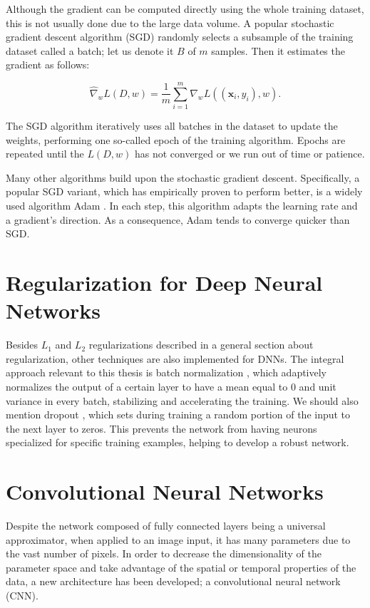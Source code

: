 Although the gradient can be computed directly using the whole training dataset, this is not usually done due to the large data volume. A popular stochastic gradient descent algorithm (SGD) \citep{kiefer1952stochastic} randomly selects a subsample of the training dataset called a batch; let us denote it $B$ of $m$ samples. Then it estimates the gradient as follows:

\begin{equation}
	\hat{\nabla}_w L(D, w) = \frac{1}{m} \sum_{i=1}^m \nabla_w L((\textbf{x}_i, y_i), w).
\end{equation}
 

The SGD algorithm iteratively uses all batches in the dataset to update the weights, performing one so-called epoch of the training algorithm. Epochs are repeated until the $L(D, w)$ has not converged or we run out of time or patience.

Many other algorithms build upon the stochastic gradient descent. Specifically, a popular SGD variant, which has empirically proven to perform better, is a widely used algorithm Adam \citep{kingma2014adam}. In each step, this algorithm adapts the learning rate and a gradient’s direction. As a consequence, Adam tends to converge quicker than SGD.

\section{Regularization for Deep Neural Networks}

Besides $L_1$ and $L_2$ regularizations described in a general section about regularization, other techniques are also implemented for DNNs. The integral approach relevant to this thesis is batch normalization \citep{ioffe2015batch}, which adaptively normalizes the output of a certain layer to have a mean equal to 0 and unit variance in every batch, stabilizing and accelerating the training. We should also mention dropout \citep{srivastava2014dropout}, which sets during training a random portion of the input to the next layer to zeros. This prevents the network from having neurons specialized for specific training examples, helping to develop a robust network.

\section{Convolutional Neural Networks}

Despite the network composed of fully connected layers being a universal approximator, when applied to an image input, it has many parameters due to the vast number of pixels. In order to decrease the dimensionality of the parameter space and take advantage of the spatial or temporal properties of the data, a new architecture has been developed; a convolutional neural network (CNN).


